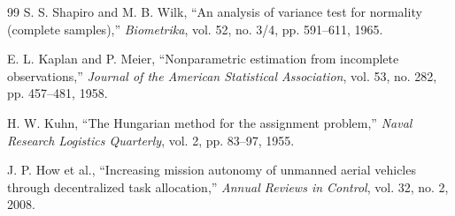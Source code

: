 \begin{thebibliography}{99}
S. S. Shapiro and M. B. Wilk,
``An analysis of variance test for normality (complete samples),''
\emph{Biometrika}, vol. 52, no. 3/4, pp. 591--611, 1965.

E. L. Kaplan and P. Meier,
``Nonparametric estimation from incomplete observations,''
\emph{Journal of the American Statistical Association}, vol. 53, no. 282, pp. 457--481, 1958.

H. W. Kuhn,
``The Hungarian method for the assignment problem,''
\emph{Naval Research Logistics Quarterly}, vol. 2, pp. 83--97, 1955.

J. P. How et al.,
``Increasing mission autonomy of unmanned aerial vehicles through decentralized task allocation,''
\emph{Annual Reviews in Control}, vol. 32, no. 2, 2008.

\end{thebibliography}